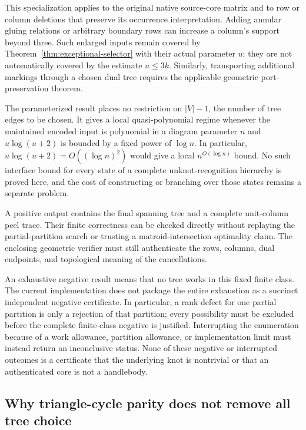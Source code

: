 This specialization applies to the original native source-core matrix and
to row or column deletions that preserve its occurrence interpretation.
Adding annular gluing relations or arbitrary boundary rows can increase
a column's support beyond three.  Such enlarged inputs remain covered by
Theorem~\ref{thm:exceptional-selector} with their actual parameter $u$;
they are not automatically covered by the estimate $u\leq3k$.  Similarly,
transporting additional markings through a chosen dual tree requires the
applicable geometric port-preservation theorem.

The parameterized result places no restriction on $|V|-1$, the number of
tree edges to be chosen.  It gives a local quasi-polynomial regime whenever
the maintained encoded input is polynomial in a diagram parameter $n$
and $u\log(u+2)$ is bounded by a fixed power of $\log n$.  In particular,
$u\log(u+2)=O((\log n)^2)$ would give a local
$n^{O(\log n)}$ bound.  No such interface bound for every state of a
complete unknot-recognition hierarchy is proved here, and the cost of
constructing or branching over those states remains a separate problem.

\begin{remark}
\label{rem:exceptional-status}
A positive output contains the final spanning tree and a complete
unit-column peel trace.  Their finite correctness can be checked directly
without replaying the partial-partition search or trusting a
matroid-intersection optimality claim.  The enclosing geometric verifier
must still authenticate the rows, columns, dual endpoints, and topological
meaning of the cancellations.

An exhaustive negative result means that no tree works in this fixed
finite class.  The current implementation does not package the entire
exhaustion as a succinct independent negative certificate.  In particular,
a rank defect for one partial partition is only a rejection of that
partition; every possibility must be excluded before the complete
finite-class negative is justified.  Interrupting the enumeration because
of a work allowance, partition allowance, or implementation
limit must instead return an inconclusive status.  None of these negative
or interrupted outcomes is a certificate that the underlying knot is
nontrivial or that an authenticated core is not a handlebody.
\end{remark}

\subsection{Why triangle-cycle parity does not remove all tree choice}
\label{subsec:exceptional-triangle-witness}

